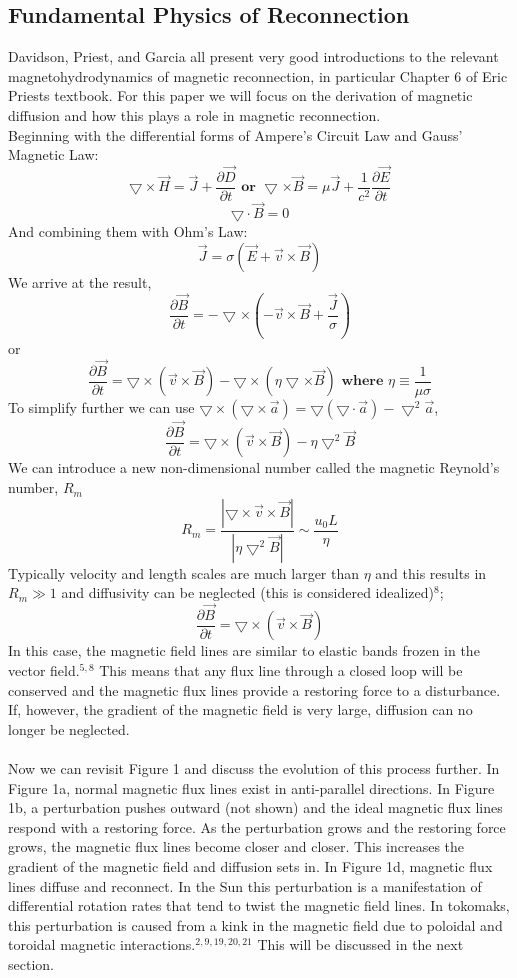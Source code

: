 \documentclass{article}
\begin{document}
\subsection{Fundamental Physics of Reconnection}
Davidson, Priest, and Garcia all present very good introductions to the relevant magnetohydrodynamics of magnetic reconnection, in particular Chapter 6 of Eric Priests textbook.  For this paper we will focus on the derivation of magnetic diffusion and how this plays a role in magnetic reconnection.\\
Beginning with the differential forms of Ampere's Circuit Law and Gauss' Magnetic Law:
$$\bigtriangledown \times \vec{H}=\vec{J}+\frac{\partial \vec{D}}{\partial t} \textbf{ or } \bigtriangledown \times \vec{B}=\mu\vec{J}+\frac{1}{c^2}\frac{\partial \vec{E}}{\partial t}$$
$$\bigtriangledown \cdot \vec{B} = 0$$
And combining them with Ohm's Law:
$$\vec{J}=\sigma\left(\vec{E}+\vec{v}\times\vec{B}\right)$$
We arrive at the result,
$$\frac{\partial\vec{B}}{\partial t}=-\bigtriangledown\times\left(-\vec{v}\times\vec{B}+\frac{\vec{J}}{\sigma}\right)$$
or
$$\frac{\partial\vec{B}}{\partial t}=\bigtriangledown\times\left(\vec{v}\times\vec{B}\right)-\bigtriangledown\times\left(\eta\bigtriangledown\times\vec{B}\right) \textbf{ where }\eta\equiv\frac{1}{\mu\sigma}$$
To simplify further we can use $\bigtriangledown\times\left(\bigtriangledown\times\vec{a}\right)=\bigtriangledown\left(\bigtriangledown\cdot\vec{a}\right)-\bigtriangledown^2\vec{a}$,
$$\frac{\partial\vec{B}}{\partial t}=\bigtriangledown\times\left(\vec{v}\times\vec{B}\right)-\eta\bigtriangledown^2\vec{B}$$
We can introduce a new non-dimensional number called the magnetic Reynold's number, $R_m$
$$R_m=\frac{\left|\bigtriangledown\times\vec{v}\times\vec{B}\right|}{\left|\eta\bigtriangledown^2\vec{B}\right|}\sim\frac{u_0 L}{\eta}$$
Typically velocity and length scales are much larger than $\eta$ and this results in $R_m\gg1$ and diffusivity can be neglected (this is considered idealized)$^{8}$;
$$\frac{\partial\vec{B}}{\partial t}=\bigtriangledown\times\left(\vec{v}\times\vec{B}\right)$$
In this case, the magnetic field lines are similar to elastic bands frozen in the vector field.$^{5,8}$  This means that any flux line through a closed loop will be conserved and the magnetic flux lines provide a restoring force to a disturbance.  If, however, the gradient of the magnetic field is very large, diffusion can no longer be neglected.\\\\
Now we can revisit Figure 1 and discuss the evolution of this process further.  In Figure 1a, normal magnetic flux lines exist in anti-parallel directions.  In Figure 1b, a perturbation pushes outward (not shown) and the ideal magnetic flux lines respond with a restoring force.  As the perturbation grows and the restoring force grows, the magnetic flux lines become closer and closer.  This increases the gradient of the magnetic field and diffusion sets in.  In Figure 1d, magnetic flux lines diffuse and reconnect.  In the Sun this perturbation is a manifestation of differential rotation rates that tend to twist the magnetic field lines.  In tokomaks, this perturbation is caused from a kink in the magnetic field due to poloidal and toroidal magnetic interactions.$^{2,9,19,20,21}$  This will be discussed in the next section.
\end{document}
